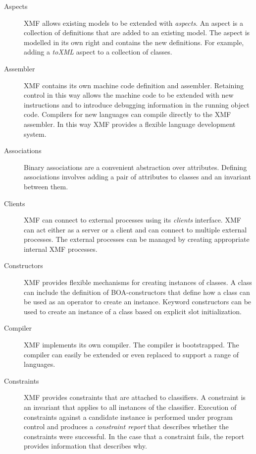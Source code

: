 \documentclass{article}
\begin{document}
\begin{description}

\item[Aspects]
XMF allows existing models to be extended with {\em aspects}. An aspect is
a collection of definitions that are added to an existing model. The
aspect is modelled in its own right and contains the new definitions. For
example, adding a {\em toXML} aspect to a collection of classes.

\item[Assembler]
XMF contains its own machine code definition and assembler. Retaining control
in this way allows the machine code to be extended with new instructions and
to introduce debugging information in the running object code. Compilers for
new languages can compile directly to the XMF assembler. In this way XMF provides
a flexible language development system.

\item[Associations]
Binary associations are a convenient abstraction over attributes. Defining
associations involves adding a pair of attributes to classes and an invariant
between them.

\item[Clients]
XMF can connect to external processes using its {\em clients} interface. XMF
can act either as a server or a client and can connect to multiple external
processes. The external processes can be managed by creating appropriate 
internal XMF processes.

\item[Constructors]
XMF provides flexible mechanisms for creating instances of classes. A class
can include the definition of BOA-constructors that define how a class can be
used as an operator to create an instance. Keyword constructors can be used to
create an instance of a class based on explicit slot initialization.

\item[Compiler]
XMF implements its own compiler. The compiler is bootstrapped. The compiler
can easily be extended or even replaced to support a range of languages.

\item[Constraints]
XMF provides constraints that are attached to classifiers. A constraint is
an invariant that applies to all instances of the classifier. Execution of
constraints against a candidate instance is performed under program control
and produces a {\em constraint report} that describes whether the constraints
were successful. In the case that a constraint fails, the report provides
information that describes why.


\end{description}
\end{document}
